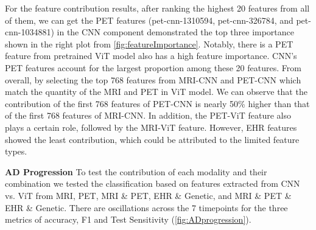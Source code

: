 For the feature contribution results, after ranking the highest 20 features from all of them, we can get the PET features (pet-cnn-1310594, pet-cnn-326784, and pet-cnn-1034881) in the CNN component demonstrated the top three importance shown in the right plot from \autoref{fig:featureImportance}. Notably, there is a PET feature from pretrained ViT model also has a high feature importance. CNN’s PET features account for the largest proportion among these 20 features. From overall, by selecting the top 768 features from MRI-CNN and PET-CNN which match the quantity of the MRI and PET in ViT model. We can observe that the contribution of the first 768 features of PET-CNN is nearly 50\% higher than that of the first 768 features of MRI-CNN. In addition, the PET-ViT feature also plays a certain role, followed by the MRI-ViT feature. However, EHR features showed the least contribution, which could be attributed to the limited feature types. 
 
\textbf{AD Progression}
To test the contribution of each modality and their combination we tested the classification based on features extracted from CNN vs. ViT from MRI, PET, MRI \& PET, EHR \& Genetic, and MRI \& PET \& EHR \& Genetic. There are oscillations across the 7 timepoints for the three metrics of accuracy, F1 and Test Sensitivity (\autoref{fig:ADprogression}).  

